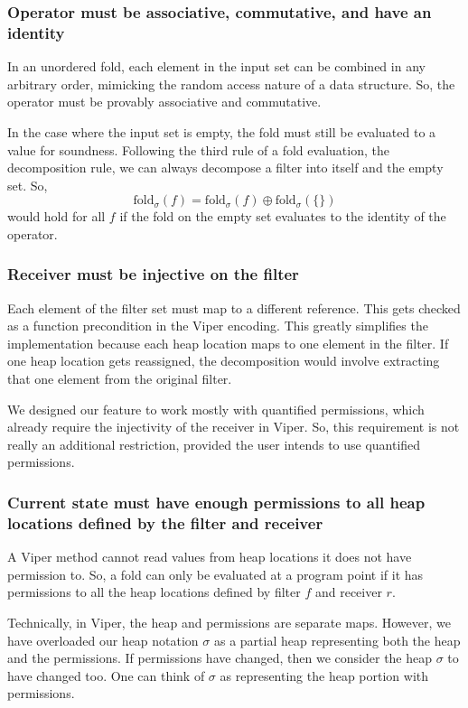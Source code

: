 \documentclass[msc,oneside]{ubcthesis}
\theoremstyle{definition}
\begin{document}
\subsubsection{Operator must be associative, commutative, and have an identity}
In an unordered fold, each element in the input set can be combined in any arbitrary order, mimicking the random access nature of a data structure. So, the operator must be provably associative and commutative. 

In the case where the input set is empty, the fold must still be evaluated to a value for soundness. Following the third rule of a fold evaluation, \ie the decomposition rule, we can always decompose a filter into itself and the empty set. So,
$$\textrm{fold}_{\sigma}(f) = \textrm{fold}_{\sigma}(f) \oplus \textrm{fold}_{\sigma}(\{\})$$ would hold for all $f$ if the fold on the empty set evaluates to the identity of the operator. 

\subsubsection{Receiver must be injective on the filter}
Each element of the filter set must map to a different reference. This gets checked as a function precondition in the Viper encoding. This greatly simplifies the implementation because each heap location maps to one element in the filter. If one heap location gets reassigned, the decomposition would involve extracting that one element from the original filter.

We designed our feature to work mostly with quantified permissions, which already require the injectivity of the receiver in Viper. So, this requirement is not really an additional restriction, provided the user intends to use quantified permissions.

\subsubsection{Current state must have enough permissions to all heap locations defined by the filter and receiver}
A Viper method cannot read values from heap locations it does not have permission to. So, a fold can only be evaluated at a program point if it has permissions to all the heap locations defined by filter $f$ and receiver $r$.

Technically, in Viper, the heap and permissions are separate maps. However, we have overloaded our heap notation $\sigma$ as a partial heap representing both the heap and the permissions. If permissions have changed, then we consider the heap $\sigma$ to have changed too. One can think of $\sigma$ as representing the heap portion with permissions.
\end{document}
